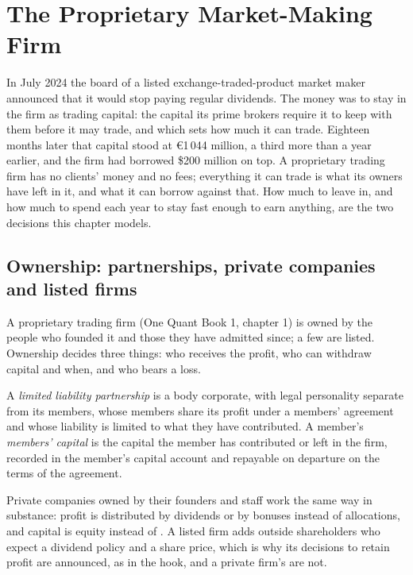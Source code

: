 \chapter{The Proprietary Market-Making Firm}\label{ch:fm:the-proprietary-market-making-firm}

In July 2024 the board of a listed exchange-traded-product market maker announced that it would stop paying regular dividends. The money was to
stay in the firm as trading capital: the capital its prime brokers require it to keep with them before it may trade, and which sets how much it
can trade. Eighteen months later that capital stood at \euro1\,044 million, a third more than a year earlier, and the firm had borrowed \$200
million on top. A proprietary trading firm has no clients' money and no fees; everything it can trade is what its owners have left in it, and
what it can borrow against that. How much to leave in, and how much to spend each year to stay fast enough to earn anything, are the two decisions
this chapter models.

\section{Ownership: partnerships, private companies and listed firms}

A proprietary trading firm (One Quant Book 1, chapter 1) is owned by the people who founded it and those they have admitted since; a few are
listed. Ownership decides three things: who receives the profit, who can withdraw capital and when, and who bears a loss.

\begin{definition}\label{def:fm:the-proprietary-market-making-firm:llp}
A \emph{limited liability partnership} is a body corporate, with legal personality separate from its members,
whose members share its profit under a members' agreement and whose liability is limited to what they have contributed. A member's
\emph{members' capital} is the capital the member has contributed or left in the firm, recorded in the member's capital
account and repayable on departure on the terms of the agreement.
\end{definition}

Private companies owned by their founders and staff work the same way in substance: profit is distributed by dividends or by bonuses instead of
allocations, and capital is equity instead of . A listed firm adds outside shareholders who expect a dividend policy and a share
price, which is why its decisions to retain profit are announced, as in the hook, and a private firm's are not.


